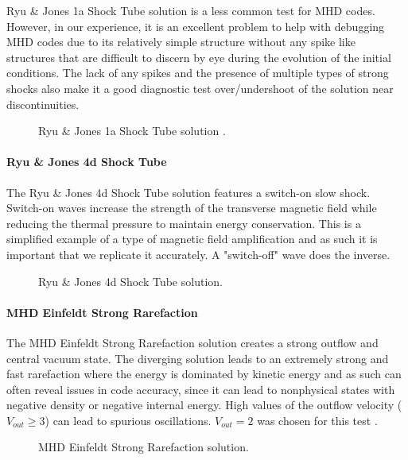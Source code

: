 Ryu \& Jones 1a Shock Tube solution \citep{ryu_jones_1995} is a less common test for MHD codes. However, in our experience, it is an excellent problem to help with debugging MHD codes due to its relatively simple structure without any spike like structures that are difficult to discern by eye during the evolution of the initial conditions. The lack of any spikes and the presence of multiple types of strong shocks also make it a good diagnostic test over/undershoot of the solution near discontinuities.

\begin{figure}[ht!]
    \caption{Ryu \& Jones 1a Shock Tube solution \citep{ryu_jones_1995}.
    }
    \label{fig:rj-1a}
\end{figure}

\paragraph{Ryu \& Jones 4d Shock Tube}

The Ryu \& Jones 4d Shock Tube solution\citep{ryu_jones_1995} features a switch-on slow shock. Switch-on waves increase the strength of the transverse magnetic field while reducing the thermal pressure to maintain energy conservation. This is a simplified example of a type of magnetic field amplification and as such it is important that we replicate it accurately. A "switch-off" wave does the inverse.

\begin{figure}[ht!]
    \caption{Ryu \& Jones 4d Shock Tube solution\citep{ryu_jones_1995}.
    }
    \label{fig:rj-4d}
\end{figure}

\paragraph{MHD Einfeldt Strong Rarefaction}

The MHD Einfeldt Strong Rarefaction solution\citep{einfeldt_1991} creates a strong outflow and central vacuum state. The diverging solution leads to an extremely strong and fast rarefaction where the energy is dominated by kinetic energy and as such can often reveal issues in code accuracy, since it can lead to nonphysical states with negative density or negative internal energy. High values of the outflow velocity ($V_{out}\ge3$) can lead to spurious oscillations. $V_{out} = 2$ was chosen for this test \citep{charm_2011}.

\begin{figure}[ht!]
    \caption{MHD Einfeldt Strong Rarefaction solution\citep{einfeldt_1991}.
    }
    \label{fig:einfeldt}
\end{figure}